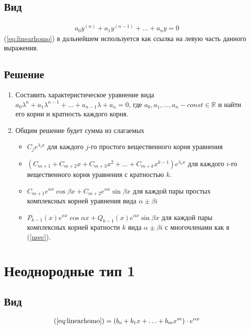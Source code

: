 \documentclass[fontsize=10pt,a4paper,fleqn]{scrreprt} %
\numberwithin{equation}{section}
\begin{document}
\subsection{Вид}
\begin{align}
\label{eq:linearhomo}
  a_0y^{(n)} + a_1y^{(n-1)} + \ldots + a_ny = 0
\end{align}
(\ref{eq:linearhomo}) в дальнейшем используется как ссылка на левую часть данного выражения.

\subsection{Решение}
\label{sec:solvelinearhomo}
\begin{enumerate}
\item Составить характеристическое уравнение вида $a_0\lambda^n + a_1\lambda^{n-1} + \ldots + a_{n-1}\lambda + a_{n} = 0$, где $a_0, a_1, \ldots, a_n - const \in \mathbb{R}$
 и найти его корни и кратность каждого корня.
\item Общим решение будет сумма из слагаемых
  \begin{itemize}
  \item $C_je^{\lambda_ix}$ для каждого $j$-го простого вещественного корня уравнения
  \item $(C_{m+1} + C_{m+2}x + C_{m+3}x^2 + \ldots + C_{m+k}x^{k-1})e^{\lambda_ix}$ для каждого $i$-го вещественного корня уравнения с кратностью $k$. \label{nsec}
  \item $C_{m+1}e^{\alpha x}\cos\beta x + C_{m+2}e^{\alpha x}\sin\beta x$ для каждой пары простых комплексных корней уравнения вида $\alpha \pm \beta i$
  \item $P_{k-1}(x)e^{\alpha x}\cos \alpha x + Q_{k-1}(x)e^{\alpha x}\sin \beta x$ для каждой пары комплексных корней кратности $k$ вида $\alpha \pm \beta i$ с многочленами как в (\ref{nsec}).
  \end{itemize}
\end{enumerate}

\section{Неоднородные тип 1}

\subsection{Вид}
\begin{align}
  \label{eq:nonlinearhomo1}
  (\ref{eq:linearhomo}) =  (b_o + b_1x + \ldots + b_mx^m)\cdot e^{\alpha x}
\end{align}
\end{document}
